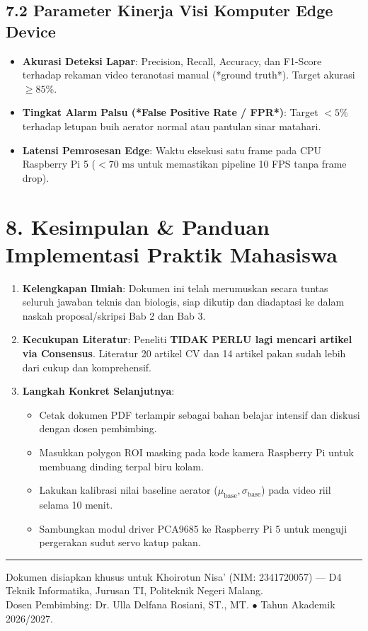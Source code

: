 \documentclass[10pt,a4paper]{article}
\providecommand{\text}[1]{\mbox{#1}}
\begin{document}
\subsection*{7.2 Parameter Kinerja Visi Komputer Edge Device}
\begin{itemize}
    \item \textbf{Akurasi Deteksi Lapar}: Precision, Recall, Accuracy, dan F1-Score terhadap rekaman video teranotasi manual (*ground truth*). Target akurasi $\ge 85\%$.
    \item \textbf{Tingkat Alarm Palsu (*False Positive Rate / FPR*)}: Target $< 5\%$ terhadap letupan buih aerator normal atau pantulan sinar matahari.
    \item \textbf{Latensi Pemrosesan Edge}: Waktu eksekusi satu frame pada CPU Raspberry Pi 5 ($< 70\text{ ms}$ untuk memastikan pipeline 10 FPS tanpa frame drop).
\end{itemize}

\section*{8. Kesimpulan \& Panduan Implementasi Praktik Mahasiswa}

\begin{enumerate}
    \item \textbf{Kelengkapan Ilmiah}: Dokumen ini telah merumuskan secara tuntas seluruh jawaban teknis dan biologis, siap dikutip dan diadaptasi ke dalam naskah proposal/skripsi Bab 2 dan Bab 3.
    \item \textbf{Kecukupan Literatur}: Peneliti \textbf{TIDAK PERLU lagi mencari artikel via Consensus}. Literatur 20 artikel CV dan 14 artikel pakan sudah lebih dari cukup dan komprehensif.
    \item \textbf{Langkah Konkret Selanjutnya}:
    \begin{itemize}
        \item Cetak dokumen PDF terlampir sebagai bahan belajar intensif dan diskusi dengan dosen pembimbing.
        \item Masukkan polygon ROI masking pada kode kamera Raspberry Pi untuk membuang dinding terpal biru kolam.
        \item Lakukan kalibrasi nilai baseline aerator ($\mu_{\text{base}}, \sigma_{\text{base}}$) pada video riil selama 10 menit.
        \item Sambungkan modul driver PCA9685 ke Raspberry Pi 5 untuk menguji pergerakan sudut servo katup pakan.
    \end{itemize}
\end{enumerate}

\vspace{0.2cm}
\rule{\textwidth}{0.6pt}
\begin{center}
    \footnotesize
    Dokumen disiapkan khusus untuk Khoirotun Nisa' (NIM: 2341720057) --- D4 Teknik Informatika, Jurusan TI, Politeknik Negeri Malang.\\
    Dosen Pembimbing: Dr. Ulla Delfana Rosiani, ST., MT. $\bullet$ Tahun Akademik 2026/2027.
\end{center}
\end{document}
